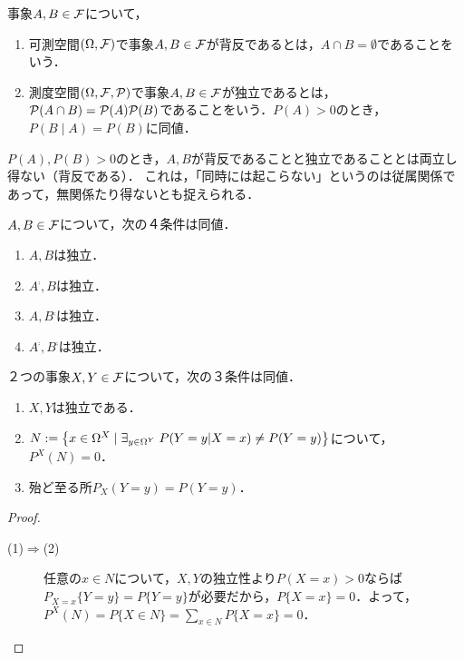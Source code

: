 \documentclass[uplatex,dvipdfmx]{jsreport}
\begin{document}
\begin{definition}[independent]
    事象$A,B\in\calF$について，
    \begin{enumerate}
        \item 可測空間$(\Omega,\calF)$で事象$A,B\in\calF$が背反であるとは，$A\cap B=\emptyset$であることをいう．
        \item 測度空間$(\Omega,\calF,\P)$で事象$A,B\in\calF$が独立であるとは，$\P(A\cap B)=\P(A)\P(B)$であることをいう．$P(A)>0$のとき，$P(B\mid A)=P(B)$に同値．
    \end{enumerate}
\end{definition}
\begin{remark}
    $P(A),P(B)>0$のとき，$A,B$が背反であることと独立であることとは両立し得ない（背反である）．
    これは，「同時には起こらない」というのは従属関係であって，無関係たり得ないとも捉えられる．
\end{remark}

\begin{lemma}[補集合演算に関する関手性]
    $A,B\in\F$について，次の４条件は同値．
    \begin{enumerate}
        \item $A,B$は独立．
        \item $A^\comp,B$は独立．
        \item $A,B^\comp$は独立．
        \item $A^\comp,B^\comp$は独立．
    \end{enumerate}
\end{lemma}

\begin{theorem}[独立性の特徴付け]
    ２つの事象$X,Y\in\calF$について，次の３条件は同値．
    \begin{enumerate}
        \item $X,Y$は独立である．
        \item $N:=\Brace{x\in\Om^X\mid \exists_{y\in\Om^Y}\;P(Y=y|X=x)\ne P(Y=y)}$について，$P^X(N)=0$．
        \item 殆ど至る所$P_X(Y=y)=P(Y=y)$．
    \end{enumerate}
\end{theorem}
\begin{proof}\mbox{}
    \begin{description}
        \item[(1)$\Rightarrow$(2)] 任意の$x\in N$について，$X,Y$の独立性より$P(X=x)>0$ならば$P_{X=x}\{Y=y\}=P\{Y=y\}$が必要だから，$P\{X=x\}=0$．よって，$P^X(N)=P\{X\in N\}=\sum_{x\in N}P\{X=x\}=0$．
    \end{description}
\end{proof}
\end{document}
